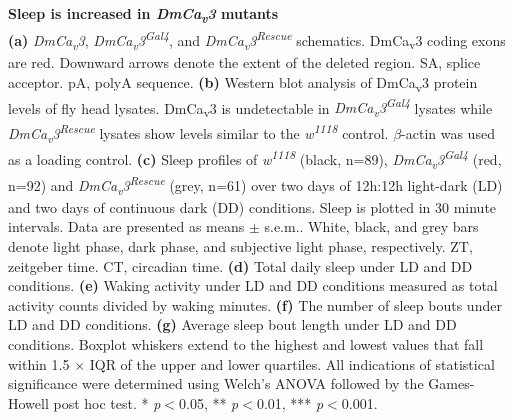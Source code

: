 \label{fig:3}
\textbf{Sleep is increased in \emph{DmCa\textsubscript{v}3} mutants}
\\
\textbf{(a)} \emph{DmCa\textsubscript{v}3}, \emph{DmCa\textsubscript{v}3\textsuperscript{Gal4}}, and \emph{DmCa\textsubscript{v}3\textsuperscript{Rescue}} schematics. 
DmCa\textsubscript{v}3 coding exons are red.
Downward arrows denote the extent of the deleted region.
SA, splice acceptor.
pA, polyA sequence.  
\textbf{(b)} Western blot analysis of DmCa\textsubscript{v}3 protein levels of fly head lysates.
DmCa\textsubscript{v}3 is undetectable in \emph{DmCa\textsubscript{v}3\textsuperscript{Gal4}} lysates while \emph{DmCa\textsubscript{v}3\textsuperscript{Rescue}} lysates show levels similar to the \emph{w\textsuperscript{1118}} control.
$\beta$-actin was used as a loading control.
\textbf{(c)} Sleep profiles of \emph{w\textsuperscript{1118}} (black, n=89), \emph{DmCa\textsubscript{v}3\textsuperscript{Gal4}} (red, n=92) and \emph{DmCa\textsubscript{v}3\textsuperscript{Rescue}}  (grey, n=61) over two days of 12h:12h light-dark (LD) and two days of continuous dark (DD) conditions.
Sleep is plotted in 30 minute intervals.
Data are presented as means $\pm$ s.e.m..
White, black, and grey bars denote light phase, dark phase, and subjective light phase, respectively.
ZT, zeitgeber time.
CT, circadian time.
\textbf{(d)} Total daily sleep under LD and DD conditions.
\textbf{(e)} Waking activity under LD and DD conditions measured as total activity counts divided by waking minutes.
\textbf{(f)} The number of sleep bouts under LD and DD conditions.
\textbf{(g)} Average sleep bout length under LD and DD conditions.
Boxplot whiskers extend to the highest and lowest values that fall within 1.5 $\times$ IQR of the upper and lower quartiles.
All indications of statistical significance were determined using Welch's ANOVA followed by the Games-Howell post hoc test.
* \emph{p}$<$0.05, ** \emph{p}$<$0.01, *** \emph{p}$<$0.001.

  
  